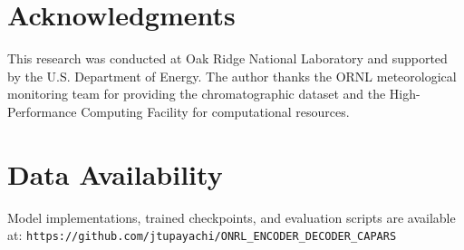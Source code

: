 \documentclass[12pt,a4paper]{article}
\begin{document}
\section*{Acknowledgments}

This research was conducted at Oak Ridge National Laboratory and supported by the U.S. Department of Energy. The author thanks the ORNL meteorological monitoring team for providing the chromatographic dataset and the High-Performance Computing Facility for computational resources.

\section*{Data Availability}

Model implementations, trained checkpoints, and evaluation scripts are available at: \texttt{https://github.com/jtupayachi/ONRL\_ENCODER\_DECODER\_CAPARS}
\end{document}
